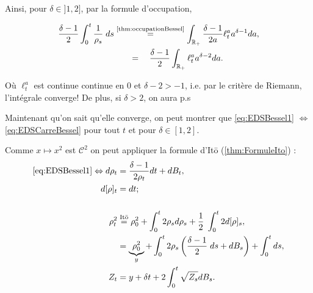 \documentclass[openany]{book}
\newcommand{\R}{\mathbb{R}}
\newcommand{\1}{\mathbbm{1}}
\theoremstyle{thmfont}
\theoremstyle{deffont}
\theoremstyle{thmfont}
\theoremstyle{deffont}
\begin{document}
Ainsi, pour $\delta \in ]1,2]$, par la formule d'occupation, 

\begin{align*}
  \dfrac{\delta-1}{2}\int_0^t \dfrac{1}{\rho_s} \; ds &\overset{\text{\autoref{thm:occupationBessel}}}{=} \int_{\R_+} \dfrac{\delta-1}{2 a} \ell_t^a a^{\delta-1} da,\\
  &\quad\;\;\;=\quad \dfrac{\delta-1}{2} \int_{\R_+} \ell_t^a a^{\delta-2} da.
\end{align*}

Où $\ell_t^a$ est continue continue en $0$ et $\delta-2 >-1$, i.e. par le critère de Riemann, l'intégrale converge! De plus, si $\delta > 2$, on aura p.s

Maintenant qu'on sait qu'elle converge, on peut montrer que \eqref{eq:EDSBessel1} $\Leftrightarrow$ \eqref{eq:EDSCarreBessel} pour tout $t$ et pour $\delta \in [1,2]$.

  Comme $x \mapsto x^2$ est $\mathcal C^2$ on peut appliquer la formule d'Itō (\autoref{thm:FormuleIto}) :
\begin{alignat*}{1}
  \eqref{eq:EDSBessel1} \Leftrightarrow d\rho_t
  &= \dfrac{\delta -1}{2\rho_t}dt + dB_t,\\
  d[\rho]_t &= dt;\\\\
  \rho_t^2 &\overset{\text{Itō}}{=} \rho_0^2 + \int_0^t 2\rho_s d\rho_s + \dfrac{1}{2}\;\int_0^t2 d[\rho]_s,\\
  &= \underbrace{\rho_0^2}_y + \int_0^t2 \rho_s \left(\dfrac{\delta -1}{2}\; ds + dB_s\right) +\int_0^t ds,\\
  Z_t &= y + \delta t + 2\int_0^t \sqrt{Z_s} dB_s.
\end{alignat*}
\end{document}
